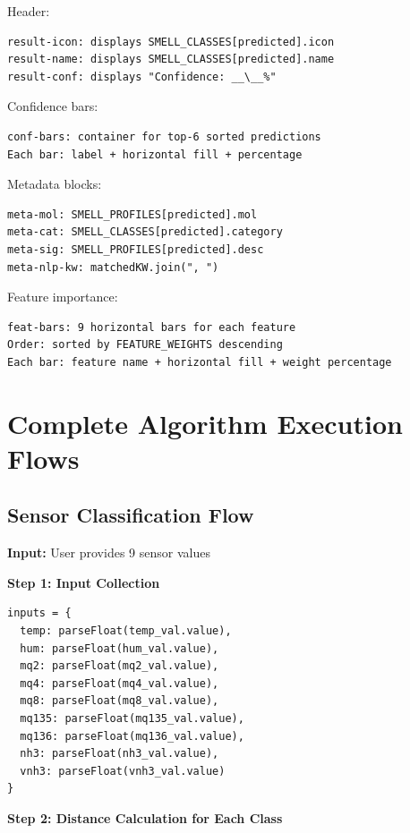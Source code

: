\documentclass[12pt,a4paper]{article}
\begin{document}
Header:
\begin{verbatim}
result-icon: displays SMELL_CLASSES[predicted].icon
result-name: displays SMELL_CLASSES[predicted].name
result-conf: displays "Confidence: __\__%"
\end{verbatim}

Confidence bars:
\begin{verbatim}
conf-bars: container for top-6 sorted predictions
Each bar: label + horizontal fill + percentage
\end{verbatim}

Metadata blocks:
\begin{verbatim}
meta-mol: SMELL_PROFILES[predicted].mol
meta-cat: SMELL_CLASSES[predicted].category
meta-sig: SMELL_PROFILES[predicted].desc
meta-nlp-kw: matchedKW.join(", ")
\end{verbatim}

Feature importance:
\begin{verbatim}
feat-bars: 9 horizontal bars for each feature
Order: sorted by FEATURE_WEIGHTS descending
Each bar: feature name + horizontal fill + weight percentage
\end{verbatim}

\section{Complete Algorithm Execution Flows}

\subsection{Sensor Classification Flow}

\textbf{Input:} User provides 9 sensor values

\textbf{Step 1: Input Collection}
\begin{verbatim}
inputs = {
  temp: parseFloat(temp_val.value),
  hum: parseFloat(hum_val.value),
  mq2: parseFloat(mq2_val.value),
  mq4: parseFloat(mq4_val.value),
  mq8: parseFloat(mq8_val.value),
  mq135: parseFloat(mq135_val.value),
  mq136: parseFloat(mq136_val.value),
  nh3: parseFloat(nh3_val.value),
  vnh3: parseFloat(vnh3_val.value)
}
\end{verbatim}

\textbf{Step 2: Distance Calculation for Each Class}
\end{document}
